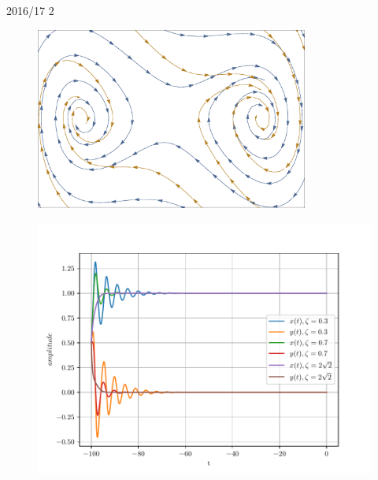 \begin{solution}{2016/17 2}
\begin{figure}[h!]
        \caption{}
        \label{fig:ex2_dampedDuffing07Vec}
    \end{figure}
    \begin{figure}[h!]
        \centering
        \includegraphics[width=0.8\textwidth]{figures/ex2_dampedDuffing0307Vec.eps}
        \caption{}
        \label{fig:ex2_dampedDuffing0307Vec}
    \end{figure}
    \begin{figure}[h!]
        \centering
        \includegraphics[width=1\textwidth]{figures/ex2_dampedDuffing.pdf}
        \caption{}
        \label{fig:ex2_dampedDuffing}
    \end{figure}
\end{solution}

